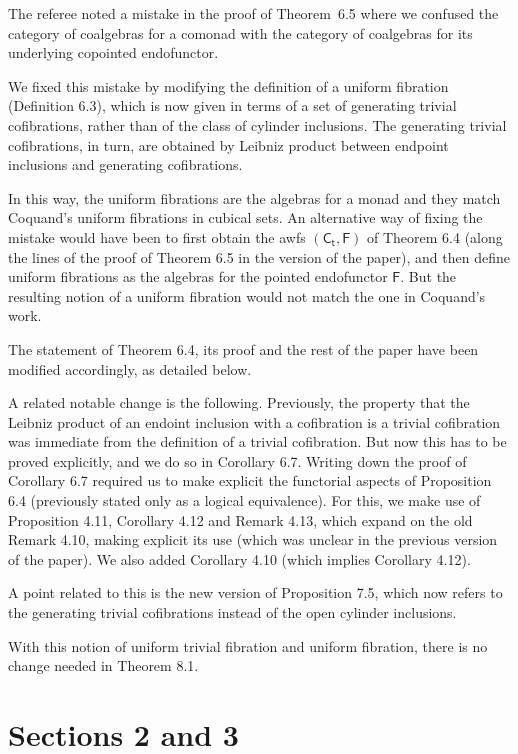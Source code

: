 \documentclass[reqno,10pt,a4paper,oneside,draft]{amsart}
\begin{document}
The referee noted a mistake in the proof of Theorem~6.5 where we 
confused the category of coalgebras for a comonad with the category of coalgebras for its underlying copointed endofunctor. 

We fixed this mistake by modifying the definition of a uniform fibration (Definition 6.3), which is now given in terms of a set of generating trivial cofibrations, rather than of
the class of cylinder inclusions. The generating trivial cofibrations, in turn, are obtained by Leibniz product between endpoint inclusions and generating cofibrations. 

In this way, the uniform fibrations are the algebras for a monad and they match Coquand's uniform fibrations in cubical sets. 
An alternative way of fixing the mistake would have been to first obtain the awfs $(\mathsf{C_t}, \mathsf{F})$ of Theorem 6.4 (along the lines of the proof of Theorem 6.5 in the version of the paper), and then define uniform fibrations as the algebras for the pointed endofunctor $\mathsf{F}$.
But the resulting notion of a uniform fibration would not match the one in Coquand's work.


The statement of Theorem 6.4, its proof and the rest of the paper have been modified accordingly, as detailed below. 

A related notable change is the following. Previously, the property that the Leibniz product of an endoint inclusion with a cofibration is
a trivial cofibration was immediate from the definition of a trivial cofibration. But now this has to be proved explicitly, and we do
so in Corollary 6.7. Writing down the proof of Corollary 6.7 required us to make explicit the functorial aspects of Proposition 6.4 
(previously stated only as a logical equivalence). For this, we make use of Proposition 4.11, Corollary 4.12 and Remark 4.13,
which expand on the old Remark 4.10, making explicit its use (which was unclear in the previous version of the paper). We
also added Corollary 4.10 (which implies Corollary 4.12). 

A point related to this is the new version of Proposition 7.5, which now refers to the generating trivial cofibrations instead of the
open cylinder inclusions.

With this notion of uniform trivial fibration and uniform fibration, there is no change needed in Theorem 8.1. 

\section*{Sections 2 and 3} 
\end{document}
